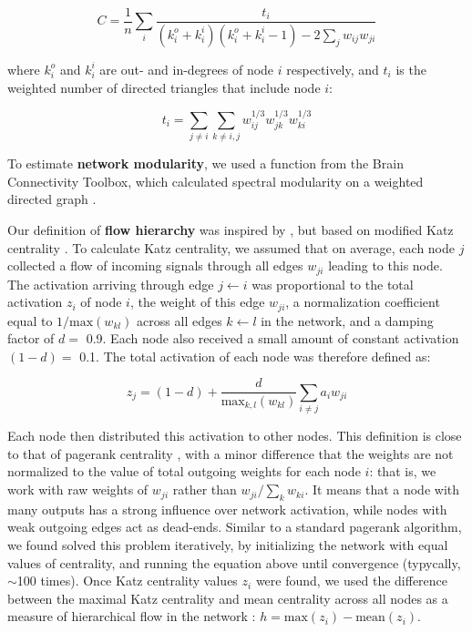 \documentclass{article}
\begin{document}
\[ C = \frac{1}{n} \sum_i{\frac {t_i}{(k^o_i+k^i_i)(k^o_i+k^i_i-1)-2\sum_j{w_{ij}w_{ji}}}} \]

where $k^o_i$ and $k^i_i$ are out- and in-degrees of node $i$ respectively, and $t_i$ is the weighted number of directed triangles that include node $i$:

\[ t_i = \sum_{j \neq i}{\sum_{k \neq i,j}{w^{1/3}_{ij}w^{1/3}_{jk}w^{1/3}_{ki}}} \]

To estimate \textbf{network modularity}, we used a function from the Brain Connectivity Toolbox, which calculated spectral modularity on a weighted directed graph \citep{reichardt2006community,leicht2008community}.

Our definition of \textbf{flow hierarchy} was inspired by \citep{mones2012hierarchy,czegel2015hierarchy}, but based on modified Katz centrality \citep{katz1953original,fletcher2018katz}. To calculate Katz centrality, we assumed that on average, each node $j$ collected a flow of incoming signals through all edges $w_{ji}$ leading to this node. The activation arriving through edge $j\leftarrow i$ was proportional to the total activation $z_i$ of node $i$, the weight of this edge $w_{ji}$, a normalization coefficient equal to $1/\text{max}(w_{kl})$ across all edges $k\leftarrow l$ in the network, and a damping factor of $d=$ 0.9. Each node also received a small amount of constant activation $(1-d)=$ 0.1. The total activation of each node was therefore defined as:

\[ z_j = (1-d) + \frac{d}{\text{max}_{k,l}(w_{kl})} \sum_{i \neq j}{a_i w_{ji}} \]

Each node then distributed this activation to other nodes. This definition is close to that of pagerank centrality \citep{page1999pagerank}, with a minor difference that the weights are not normalized to the value of total outgoing weights for each node $i$: that is, we work with raw weights of $w_{ji}$ rather than $w_{ji}/\sum_k{w_{ki}}$. It means that a node with many outputs has a strong influence over network activation, while nodes with weak outgoing edges act as dead-ends. Similar to a standard pagerank algorithm, we found solved this problem iteratively, by initializing the network with equal values of centrality, and running the equation above until convergence (typycally, $\sim$100 times). Once Katz centrality values $z_i$ were found, we used the difference between the maximal Katz centrality and mean centrality across all nodes as a measure of hierarchical flow in the network \citep{mones2012hierarchy,czegel2015hierarchy}: $h = \text{max}(z_i) - \text{mean}(z_i)$.
\end{document}
